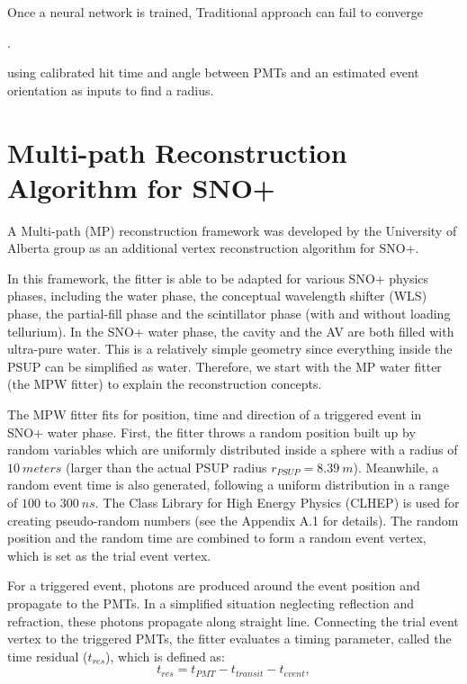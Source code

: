 Once a neural network is trained, Traditional approach can fail to converge


\cite{markNeuralNetwork,markNeuralTalk}.


using calibrated hit time
 and angle between PMTs and an estimated event orientation as inputs to find
a radius.


\section{Multi-path Reconstruction Algorithm for SNO+}\label{sect:mpw}
A Multi-path (MP) reconstruction framework was developed by the University of Alberta group as an additional vertex reconstruction algorithm for SNO+.

In this framework, the fitter is able to be adapted for various SNO+ physics phases, including the water phase, the conceptual wavelength shifter (WLS) phase, the partial-fill phase and the scintillator phase (with and without loading tellurium). In the SNO+ water phase, the cavity and the AV are both filled with ultra-pure water. This is a relatively simple geometry since everything inside the PSUP can be simplified as water. Therefore, we start with the MP water fitter (the MPW fitter) to explain the reconstruction concepts.

The MPW fitter fits for position, time and direction of a triggered event in SNO+ water phase. First, the fitter throws a random position built up by random variables which are uniformly distributed inside a sphere with a radius of $10~meters$ (larger than the actual PSUP radius $r_{PSUP}=8.39~m$). Meanwhile, a random event time is also generated, following a uniform distribution in a range of $100$ to $300~ns$. The Class Library for High Energy Physics (CLHEP) is used for creating pseudo-random numbers (see the Appendix A.1 for details). The random position and the random time are combined to form a random event vertex, which is set as the trial event vertex.

For a triggered event, photons are produced around the event position and propagate to the PMTs.
In a simplified situation neglecting reflection and refraction, these photons propagate along straight line. Connecting the trial event vertex to the triggered PMTs, the fitter evaluates a timing parameter, called the time residual ($t_{res}$), which is defined as:
\begin{equation}
\label{tres_define}
t_{res}=t_{PMT} - t_{transit} - t_{event},
\end{equation}

